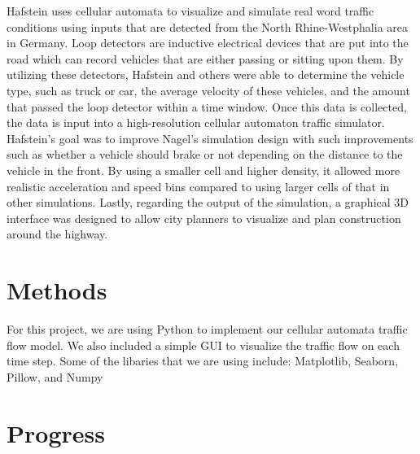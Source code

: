 \documentclass[sigplan,screen]{acmart}
\begin{document}

Hafstein uses cellular automata to visualize and simulate real word traffic
conditions using inputs that are detected from the North Rhine-Westphalia area
in Germany. \cite{hafstein_high-resolution_2004} Loop detectors are inductive
electrical devices that are put into the road which can record vehicles that are
either passing or sitting upon them. By utilizing these detectors, Hafstein and
others were able to determine the vehicle type, such as truck or car, the
average velocity of these vehicles, and the amount that passed the loop detector
within a time window. Once this data is collected, the data is input into a
high-resolution cellular automaton traffic simulator. Hafstein’s goal was to
improve Nagel’s simulation design with such improvements such as whether a
vehicle should brake or not depending on the distance to the vehicle in the
front. By using a smaller cell and higher density, it allowed more realistic
acceleration and speed bins compared to using larger cells of that in other
simulations. Lastly, regarding the output of the simulation, a graphical 3D
interface was designed to allow city planners to visualize and plan construction
around the highway.

\section{Methods}
For this project, we are using Python to implement our cellular automata traffic
flow model. We also included a simple GUI to visualize the traffic flow on each
time step. Some of the libaries that we are using include: Matplotlib, Seaborn,
Pillow, and Numpy

\section{Progress}


\end{document}
